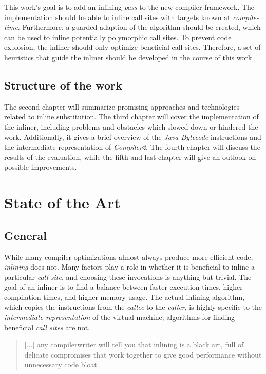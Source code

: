 \documentclass[draft, final]{vutinfth} %
\begin{document}
This work's goal is to add an inlining \emph{pass} to the new compiler framework. The implementation should be able to inline call sites with targets known at \emph{compile-time}. Furthermore, a guarded adaption of the algorithm should be created, which can be used to inline potentially polymorphic call sites. To prevent code explosion, the inliner should only optimize beneficial call sites. Therefore, a set of heuristics that guide the inliner should be developed in the course of this work.

\section{Structure of the work}

The second chapter will summarize promising approaches and technologies related to inline substitution. The third chapter will cover the implementation of the inliner, including problems and obstacles which slowed down or hindered the work. Additionally, it gives a brief overview of the \emph{Java Bytecode} instructions and the intermediate representation of \emph{Compiler2}. The fourth chapter will discuss the results of the evaluation, while the fifth and last chapter will give an outlook on possible improvements.

\chapter{State of the Art}
\label{sec:sota}

\section{General}

While many compiler optimizations almost always produce more efficient code, \emph{inlining} does not. Many factors play a role in whether it is beneficial to inline a particular \emph{call site}, and choosing these invocations is anything but trivial. The goal of an inliner is to find a balance between faster execution times, higher compilation times, and higher memory usage. The actual inlining algorithm, which copies the instructions from the \emph{callee} to the \emph{caller}, is highly specific to the \emph{intermediate representation} of the virtual machine; algorithms for finding beneficial \emph{call sites} are not. 

\begin{quote}
[...] any compilerwriter will tell you that inlining is a black art, full of delicate
compromises that work together to give good performance without unnecessary code bloat.\\
\cite[p.1]{Jones2002}
\end{quote}
\end{document}
